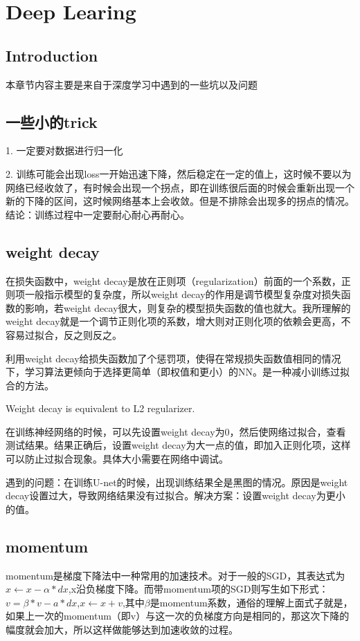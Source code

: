 \chapter{Deep Learing}

\section*{Introduction}
	本章节内容主要是来自于深度学习中遇到的一些坑以及问题
	
\section{一些小的trick}

1. 一定要对数据进行归一化

2. 训练可能会出现loss一开始迅速下降，然后稳定在一定的值上，这时候不要以为网络已经收敛了，有时候会出现一个拐点，即在训练很后面的时候会重新出现一个新的下降的区间，这时候网络基本上会收敛。但是不排除会出现多的拐点的情况。结论：训练过程中一定要耐心耐心再耐心。
	
\section{weight decay}
	\boldmath  %
	在损失函数中，weight decay是放在正则项（regularization）前面的一个系数，正则项一般指示模型的复杂度，所以weight decay的作用是调节模型复杂度对损失函数的影响，若weight decay很大，则复杂的模型损失函数的值也就大。我所理解的weight decay就是一个调节正则化项的系数，增大则对正则化项的依赖会更高，不容易过拟合，反之则反之。
	
	利用weight decay给损失函数加了个惩罚项，使得在常规损失函数值相同的情况下，学习算法更倾向于选择更简单（即权值和更小）的NN。是一种减小训练过拟合的方法。
	
	Weight decay is equivalent to L2 regularizer.
	
	在训练神经网络的时候，可以先设置weight decay为0，然后使网络过拟合，查看测试结果。结果正确后，设置weight decay为大一点的值，即加入正则化项，这样可以防止过拟合现象。具体大小需要在网络中调试。
	
	遇到的问题：在训练U-net的时候，出现训练结果全是黑图的情况。原因是weight decay设置过大，导致网络结果没有过拟合。解决方案：设置weight decay为更小的值。
	

\section{momentum}
	momentum是梯度下降法中一种常用的加速技术。对于一般的SGD，其表达式为$x \gets x-\alpha * dx$,x沿负梯度下降。而带momentum项的SGD则写生如下形式：$v=  \beta *v -a*dx$,$x \gets x+v$,其中$\beta$是momentum系数，通俗的理解上面式子就是，如果上一次的momentum（即v）与这一次的负梯度方向是相同的，那这次下降的幅度就会加大，所以这样做能够达到加速收敛的过程。
	
